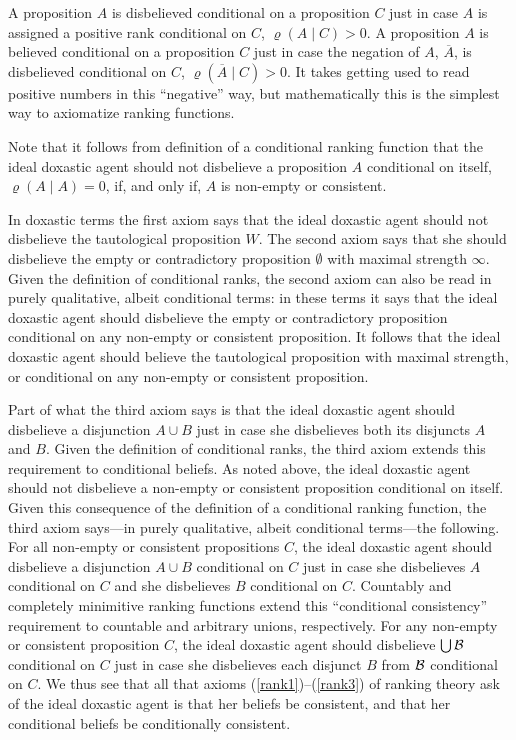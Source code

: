 A proposition $A$ is disbelieved conditional on a proposition $C$ just in case $A$ is assigned a positive rank conditional on $C$, $\varrho\left(A\mid C\right)>0$. A proposition $A$ is believed conditional on a proposition $C$ just in case the negation of $A$, $\overline{A}$, is disbelieved conditional on $C$, $\varrho\left(\overline{A}\mid C\right)>0$. It takes getting used to read positive numbers in this ``negative'' way, but mathematically this is the simplest way to axiomatize ranking functions.

Note that it follows from  definition of a conditional ranking function that the ideal doxastic agent should not disbelieve a proposition $A$ conditional on itself, $\varrho\left(A\mid A\right)=0$, if, and only if, $A$ is non-empty or consistent.

In doxastic terms the first axiom says that the ideal doxastic agent should not disbelieve the tautological proposition $W$. The second axiom says that she should disbelieve the empty or contradictory proposition $\emptyset$ with maximal strength $\infty$. Given the definition of conditional ranks, the second axiom can also be read in purely qualitative, albeit conditional terms: in these terms it says that the ideal doxastic agent should disbelieve the empty or contradictory proposition conditional on any non-empty or consistent proposition. It follows that the ideal doxastic agent should believe the tautological proposition with maximal strength, or conditional on any non-empty or consistent proposition.

Part of what the third axiom says is that the ideal doxastic agent should %
disbelieve a disjunction $A\cup B$ just in case she %
disbelieves both its disjuncts $A$ and $B$. Given the definition of conditional ranks, the third axiom extends this requirement to conditional beliefs. As noted above, the ideal doxastic agent should not disbelieve a non-empty or consistent proposition conditional on itself. Given this consequence of the definition of a conditional ranking function, the third axiom says---in purely qualitative, albeit conditional terms---the following. For all non-empty or consistent propositions $C$, the ideal doxastic agent should disbelieve a disjunction $A\cup B$ conditional on $C$ just in case she disbelieves $A$ conditional on $C$ and she disbelieves $B$ conditional on $C$. Countably and completely minimitive ranking functions extend this ``conditional consistency'' requirement to countable and arbitrary unions, respectively. For any non-empty or consistent proposition $C$, the ideal doxastic agent should disbelieve $\bigcup\cal B$ conditional on $C$ just in case she disbelieves each disjunct $B$ from $\cal B$ conditional on $C$. We thus see that all that axioms (\ref{rank1})--(\ref{rank3}) of ranking theory ask of the ideal doxastic agent is that her beliefs be consistent, and that her conditional beliefs be conditionally consistent.

